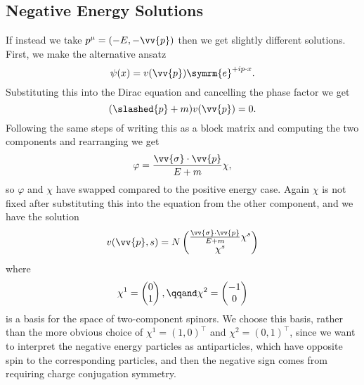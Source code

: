 \documentclass[fleqn]{NotesClass}
\newcommand{\e}{\symrm{e}}
\newcommand{\trans}{{\top}}
\begin{document}
    \subsection{Negative Energy Solutions}
    If instead we take \(p^\mu = (-E, -\vv{p})\) then we get slightly different solutions.
    First, we make the alternative ansatz
    \begin{equation}
        \psi(x) = v(\vv{p})\e^{+ip\cdot x}.
    \end{equation}
    Substituting this into the Dirac equation and cancelling the phase factor we get
    \begin{equation}
        (\slashed{p} + m)v(\vv{p}) = 0.
    \end{equation}
    Following the same steps of writing this as a block matrix and computing the two components and rearranging we get
    \begin{equation}
        \varphi = \frac{\vv{\sigma} \cdot \vv{p}}{E + m}\chi,
    \end{equation}
    so \(\varphi\) and \(\chi\) have swapped compared to the positive energy case.
    Again \(\chi\) is not fixed after substituting this into the equation from the other component, and we have the solution
    \begin{equation}
        v(\vv{p}, s) = N
        \begin{pmatrix}
            \frac{\vv{\sigma} \cdot \vv{p}}{E + m} \chi^s\\ \chi^s
        \end{pmatrix}
    \end{equation}
    where
    \begin{equation}
        \chi^1 = 
        \begin{pmatrix}
            0\\ 1
        \end{pmatrix}
        , \qqand \chi^2 = 
        \begin{pmatrix}
            -1\\ 0
        \end{pmatrix}
    \end{equation}
    is a basis for the space of two-component spinors.
    We choose this basis, rather than the more obvious choice of \(\chi^1 = (1, 0)^{\trans}\) and \(\chi^2 = (0, 1)^\trans\), since we want to interpret the negative energy particles as antiparticles, which have opposite spin to the corresponding particles, and then the negative sign comes from requiring charge conjugation symmetry.
    
\end{document}

